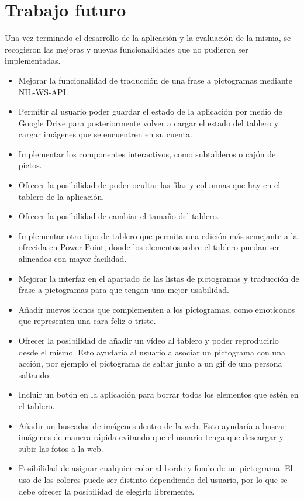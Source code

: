 \section{Trabajo futuro}

Una vez terminado el desarrollo de la aplicación y la evaluación de la misma, se recogieron las mejoras y nuevas funcionalidades que no pudieron ser implementadas. 

\begin{itemize}
	\item Mejorar la funcionalidad de traducción de una frase a pictogramas mediante NIL-WS-API.
	\item Permitir al usuario poder guardar el estado de la aplicación por medio de Google Drive para posteriormente volver a cargar el estado del tablero y cargar imágenes que se encuentren en su cuenta.
	
	\item Implementar los componentes interactivos, como subtableros o cajón de pictos.
	
	\item Ofrecer la posibilidad de poder ocultar las filas y columnas que hay en el tablero de la aplicación.
	\item Ofrecer la posibilidad de cambiar el tamaño del tablero.
	
	\item Implementar otro tipo de tablero que permita una edición más semejante a la ofrecida en Power Point, donde los elementos sobre el tablero puedan ser alineados con mayor facilidad.  
	\item Mejorar la interfaz en el apartado de las listas de pictogramas y traducción de frase a pictogramas para que tengan una mejor usabilidad.
	
	\item Añadir nuevos iconos que complementen a los pictogramas, como emoticonos que representen una cara feliz o triste.
	
	\item Ofrecer la posibilidad de añadir un vídeo al tablero y poder reproducirlo desde el mismo. Esto ayudaría al usuario a asociar un pictograma con una acción, por ejemplo el pictograma de saltar junto a un gif de una persona saltando.
	
	\item Incluir un botón en la aplicación para borrar todos los elementos que estén en el tablero.
	
	\item Añadir un buscador de imágenes dentro de la web. Esto ayudaría a buscar imágenes de manera rápida evitando que el usuario tenga que descargar y subir las fotos a la web. 
	
	\item Posibilidad de asignar cualquier color al borde y fondo de un pictograma. El uso de los colores puede ser distinto dependiendo del usuario, por lo que se debe ofrecer la posibilidad de elegirlo libremente. 
	
\end{itemize}








